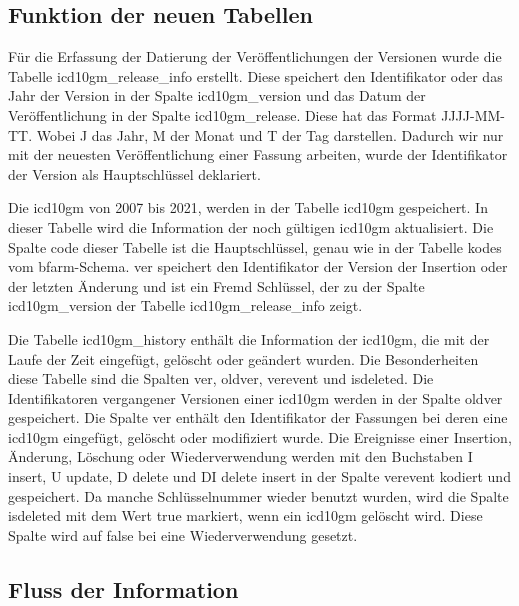 \subsection{Funktion der neuen Tabellen} \label{newtables}

Für die Erfassung der Datierung der Veröffentlichungen der Versionen wurde die Tabelle \textsf{icd10gm\_release\_info} erstellt. Diese speichert den Identifikator oder das Jahr der Version in der Spalte \textsf{icd10gm\_version} und das Datum der Veröffentlichung in der Spalte \textsf{icd10gm\_release}. Diese hat das Format \textsf{JJJJ-MM-TT}. Wobei J das Jahr, M der Monat und T der Tag darstellen. Dadurch wir nur mit der neuesten Veröffentlichung einer Fassung arbeiten, wurde der Identifikator der Version als Hauptschlüssel deklariert.


Die \ac{icd10gm} von 2007 bis 2021, werden in der Tabelle \textsf{icd10gm} gespeichert. In dieser Tabelle wird die Information der noch gültigen \ac{icd10gm} aktualisiert. Die Spalte \textsf{code} dieser Tabelle ist die Hauptschlüssel, genau wie in der Tabelle \textsf{kodes} vom \ac{bfarm}-Schema. \textsf{ver} speichert den Identifikator der Version der Insertion oder der letzten Änderung und ist ein Fremd Schlüssel, der zu der Spalte \textsf{icd10gm\_version} der Tabelle \textsf{icd10gm\_release\_info} zeigt.

Die Tabelle \textsf{icd10gm\_history} enthält die Information der \ac{icd10gm}, die mit der Laufe der Zeit eingefügt, gelöscht oder geändert wurden. Die Besonderheiten diese Tabelle sind die Spalten \textsf{ver}, \textsf{oldver}, \textsf{verevent} und \textsf{isdeleted}. Die Identifikatoren vergangener Versionen einer \ac{icd10gm} werden in der Spalte \textsf{oldver} gespeichert. Die Spalte \textsf{ver} enthält den Identifikator der Fassungen bei deren eine \ac{icd10gm} eingefügt, gelöscht oder modifiziert wurde. Die Ereignisse einer Insertion, Änderung, Löschung oder Wiederverwendung werden mit den Buchstaben \textsf{I} \glqq\textsf{insert}\grqq{}, \textsf{U} \glqq\textsf{update}\grqq{}, \textsf{D} \glqq\textsf{delete}\grqq{} und \textsf{DI} \glqq\textsf{delete insert}\grqq{} in der Spalte \textsf{verevent} kodiert und gespeichert. Da manche Schlüsselnummer wieder benutzt wurden, wird die Spalte \textsf{isdeleted} mit dem Wert \textsf{true} markiert, wenn ein \ac{icd10gm} gelöscht wird. Diese Spalte wird auf \textsf{false} bei eine Wiederverwendung gesetzt.

\subsection{Fluss der Information} \label{dbrun}


